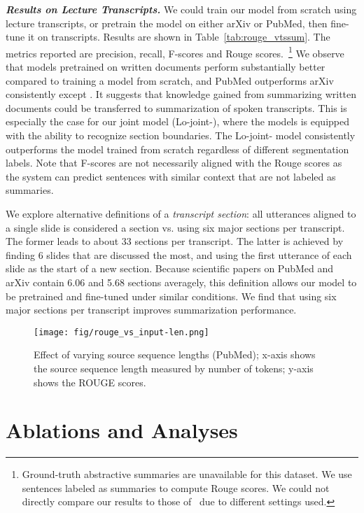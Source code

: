 \documentclass[11pt]{article}
\begin{document}
\vspace{0.05in}
\noindent\textbf{\textsl{Results on Lecture Transcripts.}}\quad
We could train our model from scratch using lecture transcripts, or pretrain the model on either arXiv or PubMed, then fine-tune it on transcripts.
Results are shown in Table~\ref{tab:rouge_vtssum}.
The metrics reported are precision, recall, F-scores and Rouge scores.~\footnote{
Ground-truth abstractive summaries are unavailable for this dataset.
We use sentences labeled as summaries to compute Rouge scores.
We could not directly compare our results to those of~\cite{lv2021vt} due to different settings used. 
} 
We observe that models pretrained on written documents perform substantially better 
compared to training a model from scratch, and PubMed outperforms arXiv consistently except .
It suggests that knowledge gained from summarizing written documents could be transferred to summarization of spoken transcripts. 
This is especially the case for our joint model (Lo-joint-),
where the models is equipped with the ability to recognize section boundaries.
The Lo-joint- model consistently outperforms the model trained from scratch regardless of different segmentation labels.
Note that F-scores are not necessarily aligned with the Rouge scores as the system can predict sentences with similar context that are not labeled as summaries.


We explore alternative definitions of a \emph{transcript section}:
all utterances aligned to a single slide is considered a section vs.
using six major sections per transcript.
The former leads to about 33 sections per transcript. 
The latter is achieved by finding 6 slides that are discussed the most,
and using the first utterance of each slide as the start of a new section. 
Because scientific papers on PubMed and arXiv contain 6.06 and 5.68 sections averagely,
this definition allows our model to be pretrained and fine-tuned 
under similar conditions.
We find that using six major sections per transcript improves summarization performance.



\begin{figure}[t]	
\centering
\texttt{[image: fig/rouge\_vs\_input-len.png]}
\caption{
Effect of varying source sequence lengths (PubMed);
x-axis shows the source sequence length measured by number of tokens;
y-axis shows the ROUGE scores.
}
\label{fig:rouge_by_seqlen}
\end{figure}


\section{Ablations and Analyses}
\label{sec:ablation}
\end{document}
